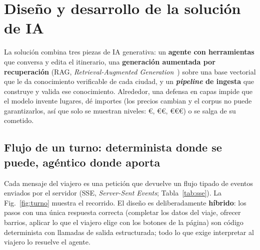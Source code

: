 \section{Diseño y desarrollo de la solución de IA}\label{sec:ia}

La solución combina tres piezas de IA generativa: un \textbf{agente con herramientas} que conversa
y edita el itinerario, una \textbf{generación aumentada por recuperación} (RAG,
\emph{Retrieval-Augmented Generation}~\cite{lewis2020rag}) sobre una base
vectorial que le da conocimiento verificable de cada ciudad, y un \textbf{\emph{pipeline} de
ingesta} que construye y valida ese conocimiento. Alrededor, una defensa en capas impide que el
modelo invente lugares, dé importes (los precios cambian y el corpus no puede garantizarlos, así
que solo se muestran niveles: €, €€, €€€) o se salga de su cometido.

\subsection{Flujo de un turno: determinista donde se puede, agéntico donde aporta}

Cada mensaje del viajero es una petición  que devuelve un flujo tipado de
eventos enviados por el servidor (SSE, \emph{Server-Sent Events}; Tabla~\ref{tab:sse}). La Fig.~\ref{fig:turno} muestra el recorrido. El diseño
es deliberadamente \textbf{híbrido}: los pasos con una única respuesta correcta (completar los
datos del viaje, ofrecer barrios, aplicar lo que el viajero elige con los botones de la página) son código
determinista con llamadas de salida estructurada; todo lo que exige interpretar al viajero lo
resuelve el agente.


